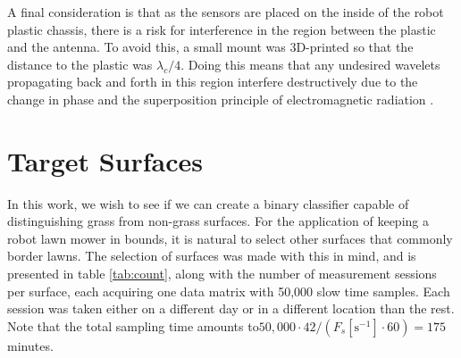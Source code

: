 A final consideration is that as the sensors are placed on the inside of the robot plastic chassis, there is a risk for interference in the region between the plastic and the antenna. To avoid this, a small mount was 3D-printed so that the distance to the plastic was $\lambda_c/4$. Doing this means that any undesired wavelets propagating back and forth in this region interfere destructively due to the change in phase and the superposition principle of electromagnetic radiation \citep{griffiths_2018}.

\section{Target Surfaces}

In this work, we wish to see if we can create a binary classifier capable of distinguishing grass from non-grass surfaces. For the application of keeping a robot lawn mower in bounds, it is natural to select other surfaces that commonly border lawns. The selection of surfaces was made with this in mind, and is presented in table \ref{tab:count}, along with the number of measurement sessions per surface, each acquiring one data matrix with 50,000 slow time samples. Each session was taken either on a different day or in a different location than the rest. Note that the total sampling time amounts to\newline $50,000\cdot42/(F_s [\text{s}^{-1}]\cdot60)=175$ minutes.

